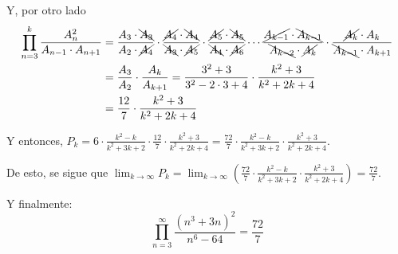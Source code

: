 \documentclass[../../main.tex]{subfiles}
\begin{document}
  Y, por otro lado
  \begin{equation*}
    \begin{split}
      \prod_{n = 3}^k \frac{A_n^2}{A_{n - 1} \cdot A_{n + 1}} & = 
      \frac{A_3 \cdot \bcancel{A_3}}{A_2 \cdot \cancel{A_4}} \cdot \frac{\cancel{A_4} \cdot \bcancel{A_4}}{\bcancel{A_3} \cdot\cancel{A_5}} \cdot \frac{\cancel{A_5} \cdot \bcancel{A_5}}{\bcancel{A_4} \cdot \cancel{A_6}} \cdots \frac{\cancel{A_{k - 1}} \cdot \bcancel{A_{k - 1}}}{\bcancel{A_{k - 2}} \cdot \cancel{A_k}} \cdot \frac{\cancel{A_k} \cdot A_k}{\bcancel{A_{k - 1}} \cdot A_{k + 1}} \\ & =
      \frac{A_3}{A_2} \cdot \frac{A_k}{A_{k + 1}} = \frac{3^2 + 3}{3^2 - 2 \cdot 3 + 4} \cdot \frac{k^2 + 3}{k^2 + 2k + 4} \\ & =
      \frac{12}{7} \cdot \frac{k^2 + 3}{k^2 + 2k + 4}
    \end{split}
  \end{equation*}

  Y entonces, $P_k = 6 \cdot \displaystyle\frac{k^2 - k}{k^2 + 3k + 2} \cdot \displaystyle\frac{12}{7} \cdot \displaystyle\frac{k^2 + 3}{k^2 + 2k + 4} = \displaystyle\frac{72}{7} \cdot \displaystyle\frac{k^2 - k}{k^2 + 3k + 2} \cdot \displaystyle\frac{k^2 + 3}{k^2 + 2k + 4}$.

  De esto, se sigue que $\displaystyle\lim_{k \to \infty} P_k = \displaystyle\lim_{k \to \infty} \left(\displaystyle\frac{72}{7} \cdot \displaystyle\frac{k^2 - k}{k^2 + 3k + 2} \cdot \displaystyle\frac{k^2 + 3}{k^2 + 2k + 4}\right) = \displaystyle\frac{72}{7}$.

  Y finalmente:
  $$
  \prod_{n = 3}^\infty \frac{(n^3 + 3n)^2}{n^6 - 64} = \frac{72}{7}
  $$
\end{document}
